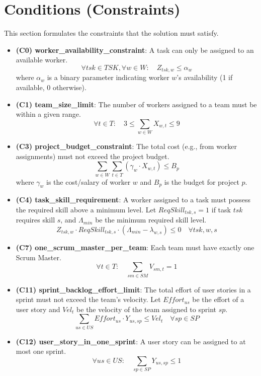 \documentclass[11pt]{article}
\begin{document}
\section{Conditions (Constraints)}
This section formulates the constraints that the solution must satisfy.
\begin{itemize}
    \item \textbf{(C0) worker\_availability\_constraint}: A task can only be assigned to an available worker.
    $$ \forall tsk \in TSK, \forall w \in W: \quad Z_{tsk,w} \leq \alpha_w $$
    where $\alpha_w$ is a binary parameter indicating worker $w$'s availability (1 if available, 0 otherwise).

    \item \textbf{(C1) team\_size\_limit}: The number of workers assigned to a team must be within a given range.
    $$ \forall t \in T: \quad 3 \leq \sum_{w \in W} X_{w,t} \leq 9 $$

    \item \textbf{(C3) project\_budget\_constraint}: The total cost (e.g., from worker assignments) must not exceed the project budget.
    $$ \sum_{w \in W} \sum_{t \in T} (\gamma_w \cdot X_{w,t}) \leq B_p $$
    where $\gamma_w$ is the cost/salary of worker $w$ and $B_p$ is the budget for project $p$.

    \item \textbf{(C4) task\_skill\_requirement}: A worker assigned to a task must possess the required skill above a minimum level. Let $ReqSkill_{tsk,s}=1$ if task $tsk$ requires skill $s$, and $\Lambda_{min}$ be the minimum required skill level.
    $$ Z_{tsk,w} \cdot ReqSkill_{tsk,s} \cdot (\Lambda_{min} - \lambda_{w,s}) \leq 0 \quad \forall tsk, w, s $$

    \item \textbf{(C7) one\_scrum\_master\_per\_team}: Each team must have exactly one Scrum Master.
    $$ \forall t \in T: \quad \sum_{sm \in SM} V_{sm,t} = 1 $$

    \item \textbf{(C11) sprint\_backlog\_effort\_limit}: The total effort of user stories in a sprint must not exceed the team's velocity. Let $Effort_{us}$ be the effort of a user story and $Vel_t$ be the velocity of the team assigned to sprint $sp$.
    $$ \sum_{us \in US} Effort_{us} \cdot Y_{us,sp} \leq Vel_t \quad \forall sp \in SP $$

    \item \textbf{(C12) user\_story\_in\_one\_sprint}: A user story can be assigned to at most one sprint.
    $$ \forall us \in US: \quad \sum_{sp \in SP} Y_{us,sp} \leq 1 $$
\end{itemize}
\end{document}
